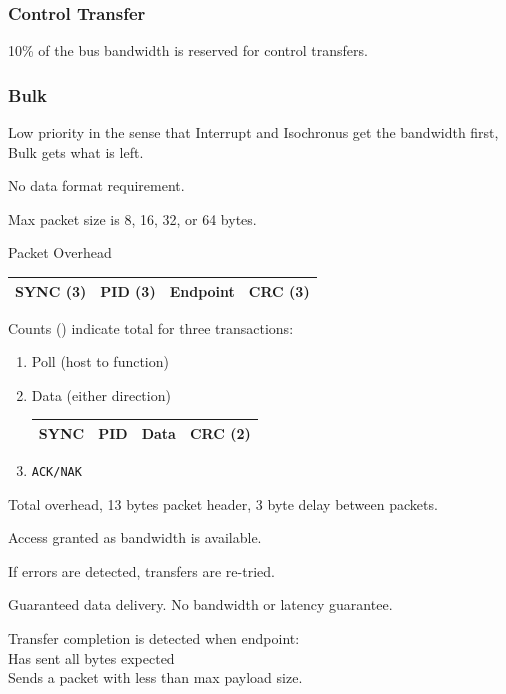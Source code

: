 \documentclass{article}	%
\begin{document}
\subsubsection{Control Transfer}
10\% of the bus bandwidth is reserved for control transfers.

\subsubsection{Bulk}
Low priority in the sense that Interrupt and Isochronus
get the bandwidth first, Bulk gets what is left.

No data format requirement.

Max packet size is 8, 16, 32, or 64 bytes.

Packet Overhead 

\begin{tabular}{|c|c|c|c| }
\hline
SYNC (3)  & PID (3) & Endpoint & CRC (3)   \\
\hline
\end{tabular}

Counts () indicate total for three transactions:

\begin{enumerate}
	\item Poll (host to function)
	\item Data (either direction) \\
	
\begin{tabular}{|c|c|c|c|}
\hline
SYNC    & PID   & Data & CRC (2)   \\
\hline
\end{tabular}

	\item {\tt ACK/NAK}
\end{enumerate}

Total overhead, 13 bytes packet header, 3 byte delay between
packets.

Access granted as bandwidth is available.

If errors are detected, transfers are re-tried.

Guaranteed data delivery. No bandwidth or latency guarantee.

Transfer completion is detected when endpoint: \\
\hspace{0.5in}Has sent all bytes expected \\
\hspace{0.5in}Sends a packet with less than max payload size.
\end{document}
